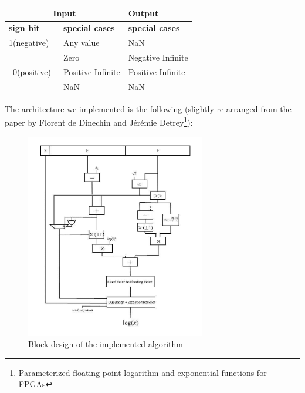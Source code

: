 \documentclass{report}
\begin{document}
\begin{table}[ht]
\centering
\begin{tabular}{|l|l|l|} 
\hline
\multicolumn{2}{|c|}{\textbf{Input}}                                          & \textbf{Output}         \\ 
\hline
\textbf{sign bit}               & \multicolumn{1}{|l|}{\textbf{special cases}} & \textbf{special cases}  \\ 
\hline
1(negative)                     & Any value                                   & NaN                     \\ 
\cline{1-3}
\multirow{4}{*}{~0(positive)~} & Zero                                        & Negative Infinite       \\
\cline{2-3}                                & Positive Infinite                           & Positive Infinite       \\
\cline{2-3}                                & NaN                                         & NaN                     \\
\hline
\end{tabular}
\end{table}
\newpage
The architecture we implemented is the following (slightly re-arranged from the paper by Florent de Dinechin and J\'{e}r\'{e}mie Detrey\footnote{\href{https://hal-ens-lyon.archives-ouvertes.fr/ensl-00542213/file/DetreyDinechinJMM.pdf} {Parameterized floating-point logarithm and exponential functions for FPGAs} }):
\begin{figure}[h]
  \centering
    \includegraphics[width=0.7\textwidth]{images/block_diagram.jpg}
    \caption{Block design of the implemented algorithm}
\end{figure}
\end{document}
